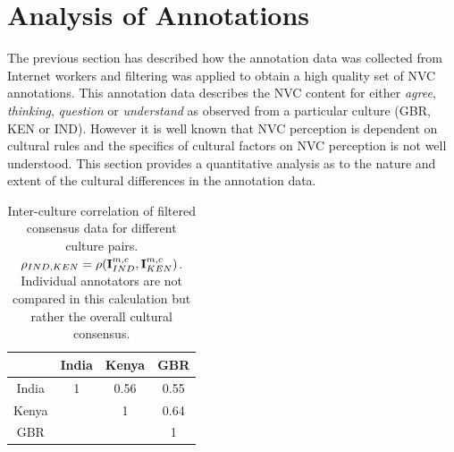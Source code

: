 
\section{Analysis of Annotations}
\label{SectionAnalysisOfCultureAnnotation}

The previous section has described how the annotation data was collected from Internet workers and filtering was applied to obtain a high quality set of \ac{NVC} annotations. This annotation data describes the \ac{NVC} content for either \textit{agree}, \textit{thinking}, \textit{question} or \textit{understand} as observed from a particular culture (GBR, KEN or IND). However it is well known that \ac{NVC} perception is dependent on cultural rules and the specifics of cultural factors on \ac{NVC} perception is not well understood. This section provides a quantitative analysis as to the nature and extent of the cultural differences in the annotation data.



\begin{table}
\centering
\caption{Inter-culture correlation of filtered consensus data for different culture pairs. $\rho_{IND,KEN} = \rho(\textbf{I}^{m, c}_{IND},\textbf{I}^{m, c}_{KEN})$. Individual annotators are not compared in this calculation but rather the overall cultural consensus.}
\begin{tabular}{ | c | c c c | }
\hline
 & India & Kenya & GBR \\
\hline
\hline
India & 1 & 0.56 & 0.55\\
Kenya &  & 1 & 0.64 \\
GBR    &  &  & 1 \\
\hline
\end{tabular}
\label{InterCultureCorrelationTable}
\end{table}

